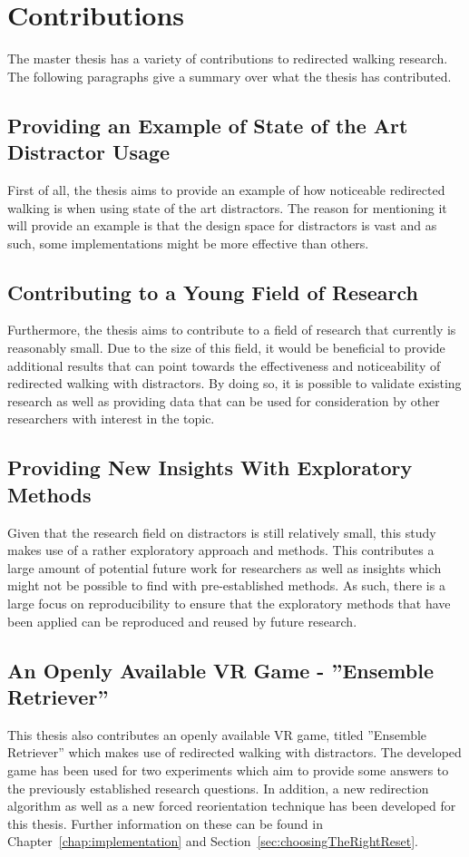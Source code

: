 \section{Contributions}
The master thesis has a variety of contributions to redirected walking research. The following paragraphs give a summary over what the thesis has contributed.

\subsection{Providing an Example of State of the Art Distractor Usage}
First of all, the thesis aims to provide an example of how noticeable redirected walking is when using state of the art distractors. The reason for mentioning it will provide an example is that the design space for distractors is vast and as such, some implementations might be more effective than others. 

\subsection{Contributing to a Young Field of Research}
Furthermore, the thesis aims to contribute to a field of research that currently is reasonably small. Due to the size of this field, it would be beneficial to provide additional results that can point towards the effectiveness and noticeability of redirected walking with distractors. By doing so, it is possible to validate existing research as well as providing data that can be used for consideration by other researchers with interest in the topic. 

\subsection{Providing New Insights With Exploratory Methods}
Given that the research field on distractors is still relatively small, this study makes use of a rather exploratory approach and methods. This contributes a large amount of potential future work for researchers as well as insights which might not be possible to find with pre-established methods. As such, there is a large focus on reproducibility to ensure that the exploratory methods that have been applied can be reproduced and reused by future research. 

\subsection{An Openly Available VR Game - ''Ensemble Retriever''}
This thesis also contributes an openly available VR game, titled ''Ensemble Retriever'' which makes use of redirected walking with distractors. The developed game has been used for two experiments which aim to provide some answers to the previously established research questions. In addition, a new redirection algorithm as well as a new forced reorientation technique has been developed for this thesis. Further information on these can be found in Chapter~\ref{chap:implementation} and Section~\ref{sec:choosingTheRightReset}. 

